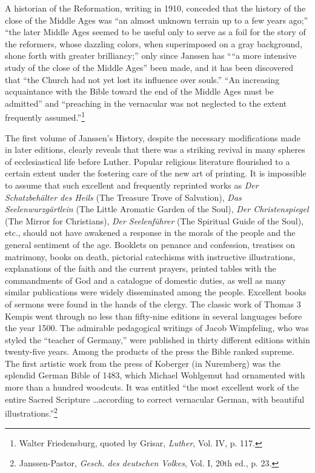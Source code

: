 A historian of the Reformation, writing in 1910, conceded that the
history of the close of the Middle Ages was “an almost unknown terrain
up to a few years ago;” “the later Middle Ages seemed to be useful only
to serve as a foil for the story of the reformers, whose dazzling colors,
when superimposed on a gray background, shone forth with greater brilliancy;”
only since Janssen has ““a more intensive study of the close of the
Middle Ages” been made, and it has been discovered that “the Church had
not yet lost its influence over souls.” “An increasing acquaintance with the
Bible toward the end of the Middle Ages must be admitted” and “preaching
in the vernacular was not neglected to the extent frequently assumed.”\footnote
{Walter Friedensburg, quoted by Grisar, \textit{Luther}, Vol. IV, p. 117.}

The first volume of Janssen’s History, despite the necessary modifications
made in later editions, clearly reveals that there was a
striking revival in many spheres of ecclesiastical life before Luther.
Popular religious literature flourished to a certain extent under the
fostering care of the new art of printing. It is impossible to assume
that such excellent and frequently reprinted works as \textit{Der Schatzbehälter
des Heils} (The Treasure Trove of Salvation), \textit{Das
Seelenwurzgärtlein} (The Little Aromatic Garden of the Soul), \textit{Der
Christenspiegel} (The Mirror for Christians), \textit{Der Seelenführer} (The
Spiritual Guide of the Soul), etc., should not have awakened a response
in the morals of the people and the general sentiment of the
age. Booklets on penance and confession, treatises on matrimony,
books on death, pictorial catechisms with instructive illustrations,
explanations of the faith and the current prayers, printed tables
with the commandments of God and a catalogue of domestic duties,
as well as many similar publications were widely disseminated among
the people. Excellent books of sermons were found in the hands of
the clergy. The classic work of Thomas 3 Kempis went through no
less than fifty-nine editions in several languages before the year
1500. The admirable pedagogical writings of Jacob Wimpfeling,
who was styled the “teacher of Germany,” were published in thirty
different editions within twenty-five years. Among the products of
the press the Bible ranked supreme. The first artistic work from the
press of Koberger (in Nuremberg) was the splendid German Bible
of 1483, which Michael Wohlgemut had ornamented with more than
a hundred woodcuts. It was entitled “the most excellent work of
the entire Sacred Scripture \dots according to correct vernacular German,
with beautiful illustrations.”\footnote
{Janssen-Pastor, \textit{Gesch. des deutschen Volkes}, Vol. I, 20th ed., p. 23.}

